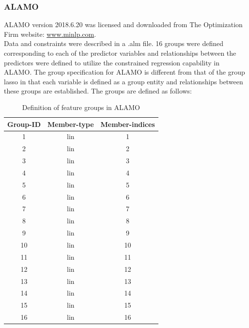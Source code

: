\documentclass[a4paper,12pt]{article}
\begin{document}
    \subsubsection{ALAMO}    
    ALAMO version 2018.6.20 was licensed and downloaded from The Optimization Firm website: \href{https://minlp.com/alamo}{www.minlp.com}.
    \\Data and constraints were described in a .alm file. 16 groups were defined corresponding to each of the predictor variables and relationships between the predictors were defined to utilize the constrained regression capability in ALAMO. The group specification for ALAMO is different from that of the group lasso in that each variable is defined as a group entity and relationships between these groups are established. The groups are defined as follows:
\begin{table}[H]
\centering
\begin{tabular}{|c|c|c|}
\hline
\textbf{Group-ID} & \textbf{Member-type} & \textbf{Member-indices} \\ \hline
1                 & lin                  & 1                       \\ \hline
2                 & lin                  & 2                       \\ \hline
3                 & lin                  & 3                       \\ \hline
4                 & lin                  & 4                       \\ \hline
5                 & lin                  & 5                       \\ \hline
6                 & lin                  & 6                       \\ \hline
7                 & lin                  & 7                       \\ \hline
8                 & lin                  & 8                       \\ \hline
9                 & lin                  & 9                       \\ \hline
10                & lin                  & 10                      \\ \hline
11                & lin                  & 11                      \\ \hline
12                & lin                  & 12                      \\ \hline
13                & lin                  & 13                      \\ \hline
14                & lin                  & 14                      \\ \hline
15                & lin                  & 15                      \\ \hline
16                & lin                  & 16                      \\ \hline
\end{tabular}
\caption{Definition of feature groups in ALAMO}
\end{table}
\end{document}
